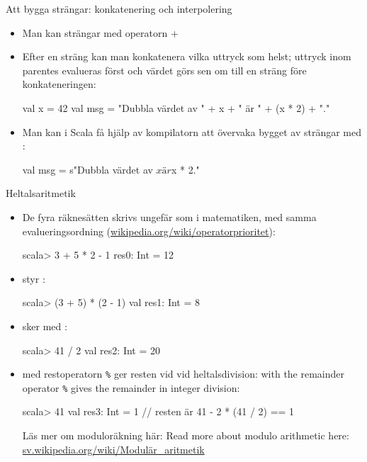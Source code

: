 \begin{Slide}{Att bygga strängar: konkatenering och interpolering}

\ifkompendium
\ExplainString
\fi 

\begin{itemize}
\item Man kan  strängar med operatorn + \\ 
\item Efter en sträng kan man konkatenera vilka uttryck som helst; uttryck inom parentes evalueras först och värdet görs sen om till en sträng före konkateneringen:
\begin{Code}
val x = 42
val msg = "Dubbla värdet av " + x + " är " + (x * 2) + "."
\end{Code}
\item Man kan i Scala få hjälp av kompilatorn att övervaka bygget av strängar med  :
\begin{Code}
val msg = s"Dubbla värdet av $x är ${x * 2}."
\end{Code}
\end{itemize}

\ifkompendium
\ExplainStringInterpolator
\fi 

\end{Slide}

\begin{Slide}{Heltalsaritmetik}\SlideFontTiny
\begin{itemize}
\item De fyra räknesätten skrivs ungefär som i matematiken, med samma evalueringsordning (\href{https://sv.wikipedia.org/wiki/Operatorprioritet}{wikipedia.org/wiki/operatorprioritet}):
\begin{REPL}
scala> 3 + 5 * 2 - 1
res0: Int = 12
\end{REPL}
\item {} styr :
\begin{REPL}
scala> (3 + 5) * (2 - 1)
val res1: Int = 8
\end{REPL}
\item {} sker med :
\begin{REPL}
scala> 41 / 2
val res2: Int = 20
\end{REPL}
\item \ifswedish{} med restoperatorn \texttt{\%} ger resten vid vid heltalsdivision:\else{} with the remainder operator \texttt{\%} gives the remainder in integer division:\fi
\begin{REPL}
scala> 41 %
val res3: Int = 1               // resten är 41 - 2 * (41 / 2) == 1
\end{REPL}
\ifswedish Läs mer om moduloräkning här: \else Read more about modulo arithmetic here: \fi \href{https://sv.wikipedia.org/wiki/Modul%C3%A4r_aritmetik}{sv.wikipedia.org/wiki/Modulär\_aritmetik}
\end{itemize}
\end{Slide}


